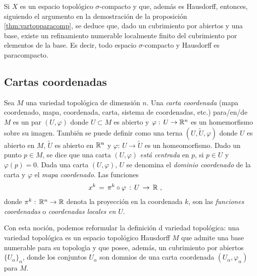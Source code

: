 \begin{remarkVarTopParacompIV}\label{rem:vartopparacompIV}
	Si $X$ es un espacio topol\'{o}gico $\sigma$-compacto y que,
	adem\'{a}s es Hausdorff, entonces, siguiendo el argumento en
	la demostraci\'{o}n de la proposici\'{o}n \ref{thm:vartopparacomp},
	se deduce que, dado un cubrimiento por abiertos y una base,
	existe un refinamiento numerable localmente finito del cubrimiento
	por elementos de la base. Es decir, todo espacio $\sigma$-compacto
	y Hausdorff es paracompacto.
\end{remarkVarTopParacompIV}

\subsection{Cartas coordenadas}
Sea $M$ una variedad topol\'{o}gica de dimensi\'{o}n $n$. Una
\emph{carta coordenada} (mapa coordenado, mapa, coordenada, carta, sistema
de coordenadas, etc.) para/en/de $M$ es un par $(U,\varphi)$ donde
$U\subset M$ es abierto y $\varphi:\,U\rightarrow\mathbb{R}^{n}$ es un
homemorfismo sobre su imagen. Tambi\'{e}n se puede definir como una terna
$(U,\tilde{U},\varphi)$ donde $U$ es abierto en $M$, $\tilde{U}$ es abierto
en $\mathbb{R}^{n}$ y $\varphi:\,U\rightarrow\tilde{U}$ es un homeomorfismo.
Dado un punto $p\in M$, se dice que una carta $(U,\varphi)$ \emph{est\'{a} %
centrada} en $p$, si $p\in U$ y $\varphi(p)=0$. Dada una carta $(U,\varphi)$,
$U$ se denomina el \emph{dominio coordenado} de la carta y $\varphi$ el
\emph{mapa coordenado}. Las funciones
\begin{align*}
	x^{k} & \,=\,\pi^{k}\circ\varphi\,:\,U\,\rightarrow\,\mathbb{R}
	\text{ ,}
\end{align*}
%
donde $\pi^{k}:\,\mathbb{R}^{n}\rightarrow\mathbb{R}$ denota la proyecci\'{o}n en la
coordenada $k$, son las \emph{funciones coordenadas} o \emph{coordenadas %
locales en $U$}.

Con esta noci\'{o}n, podemos reformular la definici\'{o}n d variedad
topol\'{o}gica: una variedad topol\'{o}gica es un espacio topol\'{o}gico
Hausdorff $M$ que admite una base numerable para su topolog\'{\i}a y
que posee, adem\'{a}s, un cubrimiento por abiertos $\{U_{\alpha}\}_{\alpha}$,
donde los conjuntos $U_{\alpha}$ son domnios de una carta coordenada
$(U_{\alpha},\varphi_{\alpha})$ para $M$.

